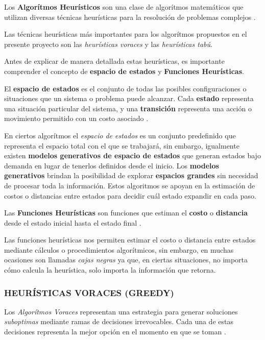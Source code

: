 \begin{definition}
    Los \textbf{Algorítmos Heurísticos} son una clase de algorítmos matemáticos que utilizan diversas técnicas heurísticas para la resolución de problemas complejos \parencite{proy2024algoritmos}.
\end{definition}

Las técnicas heurísticas más importantes para los algorítmos propuestos en el presente proyecto son las \textit{heurísticas voraces} y las \textit{heurísticas tabú}.

Antes de explicar de manera detallada estas heurísticas, es importante comprender el concepto de \textbf{espacio de estados} y \textbf{Funciones Heurísticas}. 

\begin{definition}
    El \textbf{espacio de estados} es el conjunto de todas las posibles configuraciones o situaciones que un sistema o problema puede alcanzar. Cada \textbf{estado} representa una situación particular del sistema, y una \textbf{transición} representa una acción o movimiento permitido con un costo asociado \parencite{heusner2017understanding}.
\end{definition}

En ciertos algorítmos el \textit{espacio de estados} es un conjunto predefinido que representa el espacio total con el que se trabajará, sin embargo, igualmente existen \textbf{modelos generativos de espacio de estados} que generan estados bajo demanda en lugar de tenerlos definidos desde el inicio. Los \textbf{modelos generativos} brindan la posibilidad de explorar \textbf{espacios grandes} sin necesidad de procesar toda la información. Estos algoritmos se apoyan en la estimación de costos o distancias entre estados para decidir cuál estado expandir en cada paso.

\begin{definition}
    Las \textbf{Funciones Heurísticas} son funciones que estiman el \textbf{costo} o \textbf{distancia} desde el estado inicial hasta el estado final \parencite{heusner2017understanding}.
\end{definition}

Las funciones heurísticas nos permiten estimar el costo o distancia entre estados mediante cálculos o procedimientos algorítmicos, sin embargo, en muchas ocasiones son llamadas \textit{cajas negras} ya que, en ciertas situaciones, no importa cómo calcula la heurística, solo importa la información que retorna.

\subsubsection{HEURÍSTICAS VORACES (GREEDY)}
Los \textit{Algorítmos Voraces} representan una estrategia para generar soluciones \textit{suboptimas} mediante ramas de decisiones irrevocables. Cada una de estas decisiones representa la mejor opción en el momento en que se toman \parencite{khuller2018greedy}.

